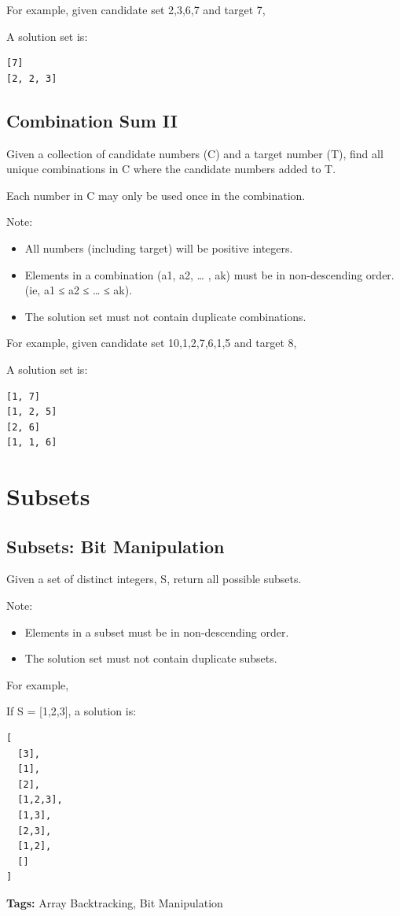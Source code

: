 \documentclass[12pt]{book}
\begin{document}
For example, given candidate set 2,3,6,7 and target 7, 

A solution set is: 
\lstset{language=java,label= ,caption= ,numbers=none}
\begin{lstlisting}
[7] 
[2, 2, 3]
\end{lstlisting}
\subsection{Combination Sum II}
\label{sec-16-2-3}
Given a collection of candidate numbers (C) and a target number (T), find all unique combinations in C where the candidate numbers added to T.

Each number in C may only be used once in the combination.

Note:
\begin{itemize}
\item All numbers (including target) will be positive integers.
\item Elements in a combination (a1, a2, … , ak) must be in non-descending order. (ie, a1 ≤ a2 ≤ … ≤ ak).
\item The solution set must not contain duplicate combinations.
\end{itemize}
For example, given candidate set 10,1,2,7,6,1,5 and target 8, 

A solution set is: 
\lstset{language=java,label= ,caption= ,numbers=none}
\begin{lstlisting}
[1, 7] 
[1, 2, 5] 
[2, 6] 
[1, 1, 6]
\end{lstlisting}
\section{Subsets}
\label{sec-16-3}
\subsection{Subsets: Bit Manipulation}
\label{sec-16-3-1}
Given a set of distinct integers, S, return all possible subsets.

Note:
\begin{itemize}
\item Elements in a subset must be in non-descending order.
\item The solution set must not contain duplicate subsets.
\end{itemize}
For example,

If S = [1,2,3], a solution is:
\lstset{language=java,label= ,caption= ,numbers=none}
\begin{lstlisting}
[
  [3],
  [1],
  [2],
  [1,2,3],
  [1,3],
  [2,3],
  [1,2],
  []
]
\end{lstlisting}
\textbf{Tags:} Array Backtracking, Bit Manipulation
\end{document}

